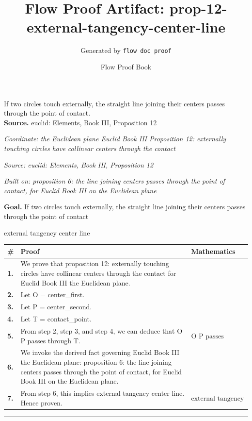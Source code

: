 \documentclass[11pt]{article}
\title{Flow Proof Artifact: prop-12-external-tangency-center-line}
\author{Generated by \texttt{flow doc proof}}
\date{Flow Proof Book}
\theoremstyle{definition}
\begin{document}
\maketitle
If two circles touch externally, the straight line joining their centers passes through the point of contact.\\[0.5em]
\textbf{Source.} euclid: Elements, Book III, Proposition 12\\[0.5em]
\bigskip
{}\par
\smallskip\noindent\textit{Coordinate: the Euclidean plane \cdot Euclid Book III \cdot Proposition 12: externally touching circles have collinear centers through the contact}\par
\smallskip\noindent\textit{Source: euclid: Elements, Book III, Proposition 12}\par
\smallskip\noindent\textit{Built on: proposition 6: the line joining centers passes through the point of contact, for Euclid Book III on the Euclidean plane}\par
\medskip
\noindent\textbf{Goal.} If two circles touch externally, the straight line joining their centers passes through the point of contact\par
\noindent$\displaystyle \text{external tangency center line}$\par
\medskip
\noindent
\begin{tabular}{@{} >{\raggedright\arraybackslash}p{} >{\raggedright\arraybackslash}p{} >{\raggedleft\arraybackslash}p{} @{}}
\textbf{\#} & \textbf{Proof} & \textbf{Mathematics} \\
\midrule
\textbf{1.} & We prove that proposition 12: externally touching circles have collinear centers through the contact for Euclid Book III the Euclidean plane. & \\[0.45em]
\textbf{2.} & Let O = center\_first. & \\[0.45em]
\textbf{3.} & Let P = center\_second. & \\[0.45em]
\textbf{4.} & Let T = contact\_point. & \\[0.45em]
\textbf{5.} & From step 2, step 3, and step 4, we can deduce that O P passes through T. & $\displaystyle \text{O P passes through T}$ \\[0.45em]
\textbf{6.} & We invoke the derived fact governing Euclid Book III the Euclidean plane: proposition 6: the line joining centers passes through the point of contact, for Euclid Book III on the Euclidean plane. & \\[0.45em]
\textbf{7.} & From step 6, this implies external tangency center line. Hence proven. & $\displaystyle \text{external tangency center line}$ \\[0.45em]
\bottomrule
\end{tabular}
\label{thm:Geometry-Euclid Book III-proposition_12_externally_touching_circles_have_collinear_centers_through_the_contact}
\par\medskip\hrule
\end{document}
